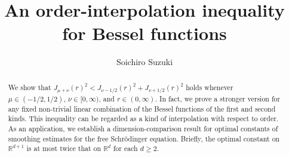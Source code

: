 \documentclass[reqno,letterpaper]{amsart}
\title{An order-interpolation inequality for Bessel functions}
\date{}
\author{Soichiro Suzuki}
\numberwithin{equation}{section}
\theoremstyle{plain}
\begin{document}
	\begin{abstract}
		We show that $J_{\mu + \nu}(r)^2 < J_{\nu-1/2}(r)^2 + J_{\nu+1/2}(r)^2$ holds whenever $\mu \in (-1/2, 1/2)$, $\nu \in [0, \infty)$, and $r \in (0, \infty)$. 
		In fact, we prove a stronger version for any fixed non-trivial linear combination of
		the Bessel functions of the first and second kinds.
		This inequality can be regarded as a kind of interpolation with respect to order. 
		As an application, we establish a dimension-comparison result for optimal constants of smoothing estimates for the free Schr\"{o}dinger equation.
		Briefly, the optimal constant on $\mathbb{R}^{d+1}$ is at most twice that on $\mathbb{R}^d$ for each $d \geq 2$.
	\end{abstract}
	\maketitle
\end{document}
